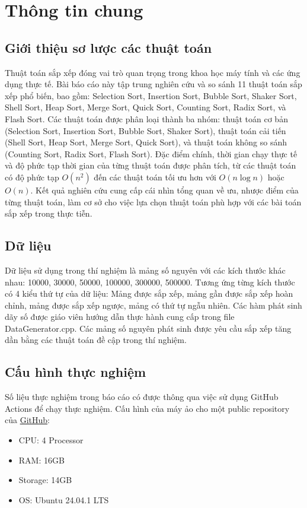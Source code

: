 \section{Thông tin chung}

\subsection{Giới thiệu sơ lược các thuật toán}

Thuật toán sắp xếp đóng vai trò quan trọng trong khoa học máy tính và các ứng dụng thực tế. Bài báo cáo này tập trung nghiên cứu và so sánh 11 thuật toán sắp xếp phổ biến, bao gồm: Selection Sort, Insertion Sort, Bubble Sort, Shaker Sort, Shell Sort, Heap Sort, Merge Sort, Quick Sort, Counting Sort, Radix Sort, và Flash Sort. Các thuật toán được phân loại thành ba nhóm: thuật toán cơ bản (Selection Sort, Insertion Sort, Bubble Sort, Shaker Sort), thuật toán cải tiến (Shell Sort, Heap Sort, Merge Sort, Quick Sort), và thuật toán không so sánh (Counting Sort, Radix Sort, Flash Sort). Đặc điểm chính, thời gian chạy thực tế và độ phức tạp thời gian của từng thuật toán được phân tích, từ các thuật toán có độ phức tạp $O(n^2)$ đến các thuật toán tối ưu hơn với $O(n \log n)$ hoặc $O(n)$. Kết quả nghiên cứu cung cấp cái nhìn tổng quan về ưu, nhược điểm của từng thuật toán, làm cơ sở cho việc lựa chọn thuật toán phù hợp với các bài toán sắp xếp trong thực tiễn.

\subsection{Dữ liệu}

Dữ liệu sử dụng trong thí nghiệm là mảng số nguyên với các kích thước khác nhau: 10000, 30000, 50000, 100000, 300000, 500000. Tương ứng từng kích thước có 4 kiểu thứ tự của dữ liệu: Mảng được sắp xếp, mảng gần được sắp xếp hoàn chỉnh, mảng được sắp xếp ngược, mảng có thứ tự ngẫu nhiên. Các hàm phát sinh dãy số được giáo viên hướng dẫn thực hành cung cấp trong file DataGenerator.cpp. Các mảng số nguyên phát sinh được yêu cầu sắp xếp tăng dần bằng các thuật toán đề cập trong thí nghiệm.

\subsection{Cấu hình thực nghiệm}
Số liệu thực nghiệm trong báo cáo có được thông qua việc sử dụng GitHub Actions để chạy thực nghiệm. Cấu hình của máy ảo cho một public repository của \href{https://docs.github.com/en/actions/using-github-hosted-runners/using-github-hosted-runners/about-github-hosted-runners#supported-runners-and-hardware-resources}{GitHub}:
\begin{itemize}
    \item CPU: 4 Processor
    \item RAM: 16GB
    \item Storage: 14GB
    \item OS: Ubuntu 24.04.1 LTS
\end{itemize}
 

 
